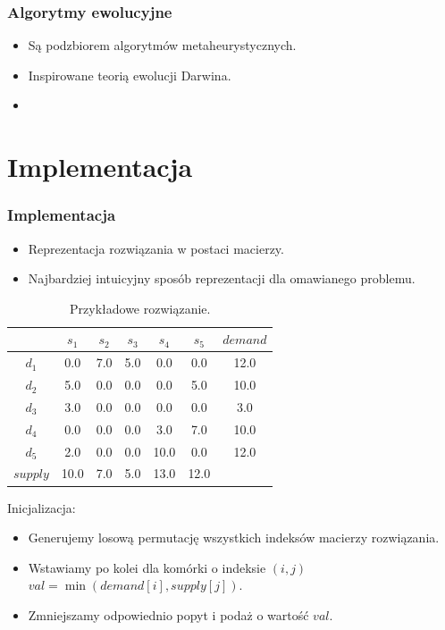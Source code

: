 \documentclass{beamer}
\begin{document}
\begin{frame}
\frametitle{Algorytmy ewolucyjne}
    \begin{itemize}
        \item Są podzbiorem algorytmów metaheurystycznych.
        \item Inspirowane teorią ewolucji Darwina.
        \item 
    \end{itemize}
\end{frame}

\section{Implementacja}

\begin{frame}
\frametitle{Implementacja}
 {
    \begin{itemize}
        \item Reprezentacja rozwiązania w postaci macierzy.
        \item Najbardziej intuicyjny sposób reprezentacji dla omawianego problemu.
    \end{itemize}
    \begin{table}
        \begin{center}
            \begin{tabular}{c||ccccc||c}
                & $s_1$ & $s_2$ & $s_3$ & $s_4$ & $s_5$ & $demand$ \\ 
                \hline
                \hline
                $d_1$ & 0.0 & 7.0 & 5.0 & 0.0 & 0.0 & 12.0 \\
                $d_2$ & 5.0 & 0.0 & 0.0 & 0.0 & 5.0 & 10.0 \\
                $d_3$ & 3.0 & 0.0 & 0.0 & 0.0 & 0.0 & 3.0 \\
                $d_4$ & 0.0 & 0.0 & 0.0 & 3.0 & 7.0 & 10.0 \\
                $d_5$ & 2.0 & 0.0 & 0.0 & 10.0 & 0.0 & 12.0 \\
                \hline
                \hline
                $supply$ & 10.0 & 7.0 & 5.0 & 13.0 & 12.0 & \\ 
            \end{tabular}
        \end{center}
        \caption{Przykładowe rozwiązanie.}
    \end{table}
}

 {
    Inicjalizacja:
    \begin{itemize}
        \item Generujemy losową permutację wszystkich indeksów macierzy rozwiązania.
        \item Wstawiamy po kolei dla komórki o indeksie $(i, j)$ $val = \min(demand[i], supply[j])$.
        \item Zmniejszamy odpowiednio popyt i podaż o wartość $val$. 
    \end{itemize}
}


\end{frame}
\end{document}
